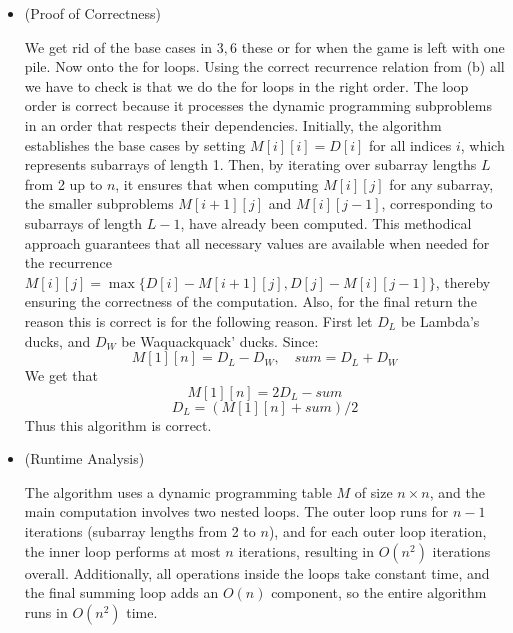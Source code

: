 \documentclass[12pt, letterpaper]{article}
\theoremstyle{definition}
\newcounter{problem}
\begin{document}
\begin{enumerate}[(a)]
    \begin{itemize}
        \item (Proof of Correctness)
        
        We get rid of the base cases in $3,6$ these or for when the game is left with one pile. Now onto the for loops. Using the correct recurrence relation from (b) all we have to check is that we do the for loops in the right order. The loop order is correct because it processes the dynamic programming subproblems in an order that respects their dependencies. Initially, the algorithm establishes the base cases by setting \(M[i][i] = D[i]\) for all indices \(i\), which represents subarrays of length 1. Then, by iterating over subarray lengths \(L\) from 2 up to \(n\), it ensures that when computing \(M[i][j]\) for any subarray, the smaller subproblems \(M[i+1][j]\) and \(M[i][j-1]\), corresponding to subarrays of length \(L-1\), have already been computed. This methodical approach guarantees that all necessary values are available when needed for the recurrence \(M[i][j] = \max\{D[i] - M[i+1][j], D[j] - M[i][j-1]\}\), thereby ensuring the correctness of the computation. Also, for the final return the reason this is correct is for the following reason. First let $D_L$ be Lambda's ducks, and $D_W$ be Waquackquack' ducks. Since:
        \[M[1][n]=D_L-D_W, \quad sum=D_L+D_W\]
        We get that
        \[M[1][n]=2D_L-sum\]
        \[D_L=(M[1][n]+sum)/2\]
        Thus this algorithm is correct.
        \item (Runtime Analysis)
        
        The algorithm uses a dynamic programming table \( M \) of size \( n \times n \), and the main computation involves two nested loops. The outer loop runs for \( n-1 \) iterations (subarray lengths from 2 to \( n \)), and for each outer loop iteration, the inner loop performs at most \( n \) iterations, resulting in \( O(n^2) \) iterations overall. Additionally, all operations inside the loops take constant time, and the final summing loop adds an \( O(n) \) component, so the entire algorithm runs in \( O(n^2) \) time.
    \end{itemize}
\end{enumerate}
\end{document}
